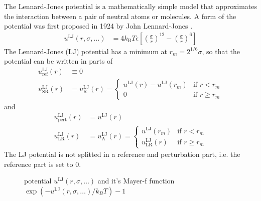 The Lennard-Jones potential is a mathematically simple model that approximates the interaction
between a pair of neutral atoms or molecules.
A form of the potential was first proposed in 1924 by John Lennard-Jones \cite{Jones1924}.
\begin{align}
u^\text{LJ}(r,\sigma,\ldots) &= 4 k_\text{B}T \epsilon \left[ \left(\frac{\sigma}{r}\right)^{12} - \left(\frac{\sigma}{r}\right)^{6}\right]
\end{align}
The Lennard-Jones (LJ) potential has a minimum at $r_m=2^{1/6} \sigma$, so that the potential can be written in parts of
\begin{align}
u^\text{LJ}_\text{ref}(r) & \equiv 0 \\
u^\text{LJ}_\text{SR}(r)  & = u^\text{LJ}_\text{R}(r) =
\begin{cases}
u^\text{LJ}(r) - u^\text{LJ}(r_m)  & \mbox{if } r <    r_m \\
0                                  & \mbox{if } r \geq r_m
\end{cases}
\end{align}
and
\begin{align}
u^\text{LJ}_\text{pert}(r) &= u^\text{LJ}(r) \\
u^\text{LJ}_\text{LR}(r)   &= u^\text{LJ}_\text{A}(r) =
\begin{cases}
u^\text{LJ}(r_m)          & \mbox{if } r <    r_m \\
u^\text{LJ}_\text{LR}(r)  & \mbox{if } r \geq r_m
\end{cases}
\end{align}
The LJ potential is not splitted in a reference and perturbation part, i.e. the reference part is set to 0.

\begin{figure}[htb]
\centering
  \quad
  \caption{potential $u^\text{LJ}(r,\sigma,\ldots)$ and it's Mayer-f function $\exp(-u^\text{LJ}(r,\sigma,\ldots)/k_BT)-1$}
\end{figure}

